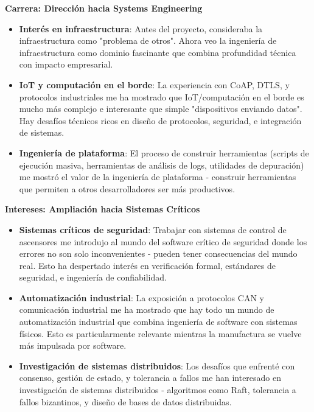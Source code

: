 \textbf{Carrera: Dirección hacia Systems Engineering}

\begin{itemize}
    \item \textbf{Interés en infraestructura}: Antes del proyecto, consideraba la infraestructura como "problema de otros". Ahora veo la ingeniería de infraestructura como dominio fascinante que combina profundidad técnica con impacto empresarial.
    
    \item \textbf{IoT y computación en el borde}: La experiencia con CoAP, DTLS, y protocolos industriales me ha mostrado que IoT/computación en el borde es mucho más complejo e interesante que simple "dispositivos enviando datos". Hay desafíos técnicos ricos en diseño de protocolos, seguridad, e integración de sistemas.
    
    \item \textbf{Ingeniería de plataforma}: El proceso de construir herramientas (scripts de ejecución masiva, herramientas de análisis de logs, utilidades de depuración) me mostró el valor de la ingeniería de plataforma - construir herramientas que permiten a otros desarrolladores ser más productivos.
\end{itemize}

\textbf{Intereses: Ampliación hacia Sistemas Críticos}

\begin{itemize}
    \item \textbf{Sistemas críticos de seguridad}: Trabajar con sistemas de control de ascensores me introdujo al mundo del software crítico de seguridad donde los errores no son solo inconvenientes - pueden tener consecuencias del mundo real. Esto ha despertado interés en verificación formal, estándares de seguridad, e ingeniería de confiabilidad.
    
    \item \textbf{Automatización industrial}: La exposición a protocolos CAN y comunicación industrial me ha mostrado que hay todo un mundo de automatización industrial que combina ingeniería de software con sistemas físicos. Esto es particularmente relevante mientras la manufactura se vuelve más impulsada por software.
    
    \item \textbf{Investigación de sistemas distribuidos}: Los desafíos que enfrenté con consenso, gestión de estado, y tolerancia a fallos me han interesado en investigación de sistemas distribuidos - algoritmos como Raft, tolerancia a fallos bizantinos, y diseño de bases de datos distribuidas.
\end{itemize}


